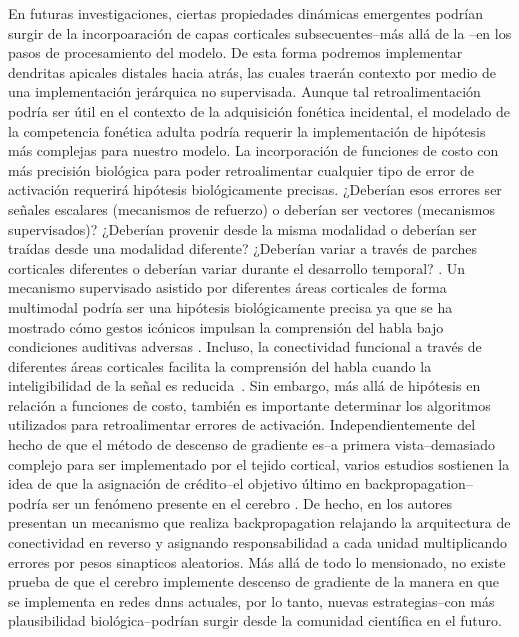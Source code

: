 {En futuras investigaciones, ciertas propiedades dinámicas emergentes podrían surgir de la incorpoaración de capas corticales subsecuentes--más allá de la --en los pasos de procesamiento del modelo. De esta forma podremos implementar dendritas apicales distales hacia atrás, las cuales traerán contexto por medio de una implementación jerárquica no supervisada.
Aunque tal retroalimentación podría ser útil en el contexto de la adquisición fonética incidental, el modelado de la competencia fonética adulta podría requerir la implementación de hipótesis más complejas para nuestro modelo. La incorporación de funciones de costo con más precisión biológica para poder retroalimentar cualquier tipo de error de activación requerirá hipótesis biológicamente precisas. ¿Deberían esos errores ser señales escalares (mecanismos de refuerzo) o deberían ser vectores (mecanismos supervisados)? ¿Deberían provenir desde la misma modalidad o deberían ser traídas desde una modalidad diferente? ¿Deberían variar a través de parches corticales diferentes o deberían variar durante el desarrollo temporal? \cite{10.3389/fncom.2016.00094}.
Un mecanismo supervisado asistido por diferentes áreas corticales de forma multimodal podría ser una hipótesis biológicamente precisa ya que se ha mostrado cómo gestos icónicos impulsan la comprensión del habla bajo condiciones auditivas adversas \cite{HOLLE2010875}.
Incluso, la conectividad funcional a través de diferentes áreas corticales facilita la comprensión del habla cuando la inteligibilidad de la señal es reducida~\cite{Obleser2283}. Sin embargo, más allá de hipótesis en relación a funciones de costo, también es importante determinar los algoritmos utilizados para retroalimentar errores de activación. Independientemente del hecho de que el método de descenso de gradiente es--a primera vista--demasiado complejo para ser implementado por el tejido cortical, varios estudios sostienen la idea de que la asignación de crédito--el objetivo último en backpropagation--podría ser un fenómeno presente en el cerebro \cite{Guerguiev2017TowardsDL}. De hecho, en \cite{Lillicrap_2016} los autores presentan un mecanismo que realiza backpropagation relajando la arquitectura de conectividad en reverso y asignando responsabilidad a cada unidad multiplicando errores por pesos sinapticos aleatorios.
Más allá de todo lo mensionado, no existe prueba de que el cerebro implemente descenso de gradiente de la manera en que se implementa en redes \glspl{dnn} actuales, por lo tanto, nuevas estrategias--con más plausibilidad biológica--podrían surgir desde la comunidad científica en el futuro.

}
